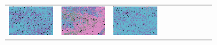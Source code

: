 \documentclass{ipol}
\begin{document}
\begin{figure}[ht]
\begin{subfigure}[t]{\linewidth}
\begin{tabular}{ccccccccc}
                \includegraphics[width=\s]{images/night/DCB/iso_j100_64_grids.png}&
                \includegraphics[width=\s]{images/night/DHT/iso_j100_64_grids.png}&
                \includegraphics[width=\s]{images/night/LINEAR/iso_j100_64_grids.png}&

\end{tabular}
\end{subfigure}
\end{figure}
\end{document}
